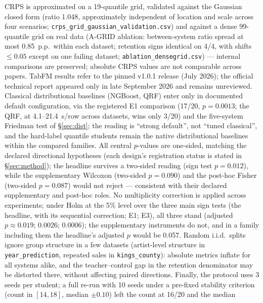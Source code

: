 \documentclass[11pt]{article}
\begin{document}
CRPS is approximated on a 19-quantile grid, validated against the
Gaussian closed form (ratio 1.048, approximately independent of
location and scale across four scenarios;
\texttt{crps\_\allowbreak grid\_\allowbreak gaussian\_\allowbreak validation.\allowbreak csv}) and against a dense
99-quantile grid on real data (A-GRID ablation: between-system ratio
spread at most 0.85~p.p.\ within each dataset; retention signs
identical on 4/4, with shifts $\leq 0.05$ except on one failing
dataset; \texttt{ablation\_\allowbreak densegrid.\allowbreak csv}) --- internal
comparisons are preserved; absolute CRPS values are not comparable
across papers. TabFM results
refer to the pinned v1.0.1 release (July 2026); the official technical
report \citep{kong2026} appeared only in late September 2026 and remains
unreviewed. Classical distributional baselines (NGBoost, QRF) enter
only in documented default configuration, via the registered E1
comparison (17/20, $p=0.0013$; the QRF, at 4.1--21.4~\textmu s/row
across datasets, wins only 3/20)
and the five-system Friedman test of \S\ref{sec:dist}; the
reading is ``strong default'', not ``tuned classical'', and the
hard-label quantile students remain the native distributional
baselines within the compared families. All central $p$-values are
one-sided, matching the declared directional hypotheses (each design's registration status is stated in \S\ref{sec:method}); the
headline survives a two-sided reading (sign test $p=0.012$), while the
supplementary Wilcoxon (two-sided $p=0.090$) and the post-hoc Fisher
(two-sided $p=0.087$) would not reject --- consistent with their
declared supplementary and post-hoc roles. No multiplicity correction
is applied across experiments; under Holm at the 5\% level over the
three main sign tests (the headline, with its sequential correction;
E1; E3), all three stand (adjusted $p \approx 0.019$; $0.0026$;
$0.0006$); the supplementary instruments do not, and in a family
including them the headline's adjusted $p$ would be 0.057. Random i.i.d.\ splits ignore group structure in a
few datasets (artist-level structure in \texttt{year\_\allowbreak prediction},
repeated sales in \texttt{kings\_county}): absolute metrics inflate
for all systems alike, and the teacher--control gap in the retention
denominator may be distorted there, without affecting paired
directions. Finally, the protocol uses 3 seeds per student; a full
re-run with 10 seeds under a pre-fixed stability criterion (count in
$[14,18]$, median $\pm 0.10$) left the count at 16/20 and the median
\end{document}
